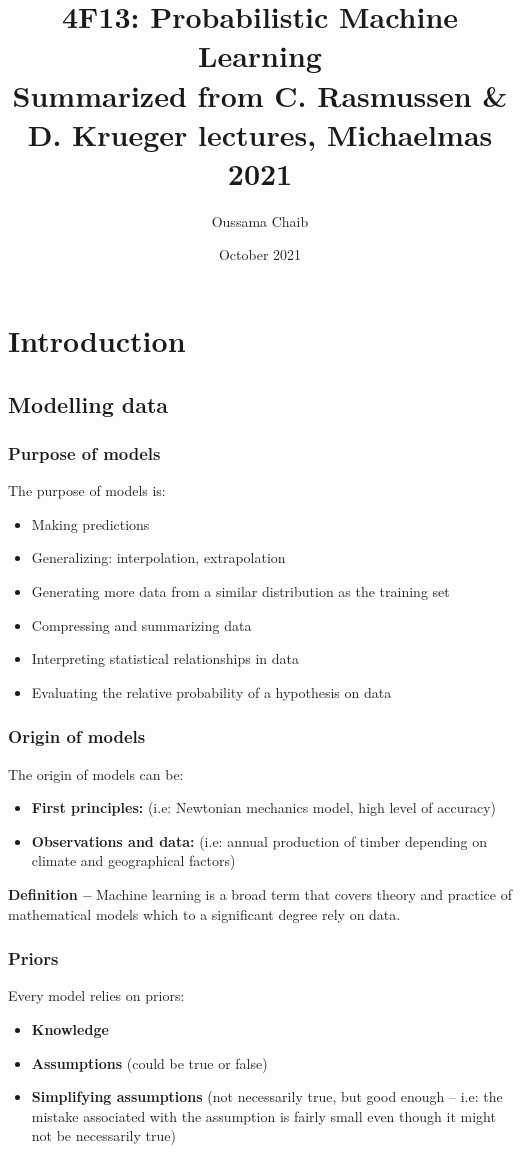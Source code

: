 \documentclass[a4paper,11pt]{article}
\title{%
	4F13: Probabilistic Machine Learning \\
	\vspace{10pt}
	\small Summarized from C. Rasmussen \& D. Krueger lectures, Michaelmas 2021}
\author{\small Oussama Chaib}
\date{\small October 2021}
\begin{document}
	\maketitle
	\tableofcontents
	\pagebreak
	\section{Introduction}
	\subsection{Modelling data}
	\subsubsection{Purpose of models}
	The purpose of models is:
	\begin{itemize}
		\item Making predictions
		\item Generalizing: interpolation, extrapolation
		\item Generating more data from a similar distribution as the training set
		\item Compressing and summarizing data
		\item Interpreting statistical relationships in data
		\item Evaluating the relative probability of a hypothesis on data
	\end{itemize}
	\subsubsection{Origin of models}
	The origin of models can be:
	\begin{itemize}
		\item \textbf{First principles:}  (i.e: Newtonian mechanics model, high level of accuracy)
		\item \textbf{Observations and data:} (i.e: annual production of timber depending on climate and geographical factors)
	\end{itemize}
	\textbf{Definition --} Machine learning is a broad term that covers theory and practice of mathematical models which to a significant degree rely on data.
	\subsubsection{Priors}
	Every model relies on priors: 
	\begin{itemize}
		\item \textbf{Knowledge}
		\item \textbf{Assumptions} (could be true or false)
		\item \textbf{Simplifying assumptions} (not necessarily true, but good enough -- i.e:  the mistake associated with the assumption is fairly small even though it might not be necessarily true)
	\end{itemize}
\end{document}
